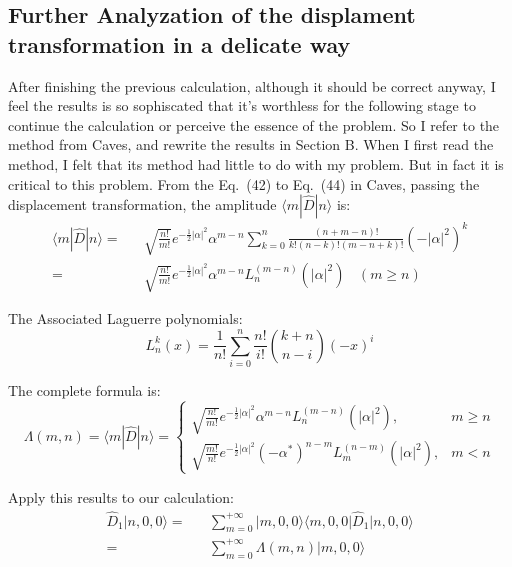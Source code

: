 \documentclass[%
 reprint,
 amsmath,amssymb,
 aps,
onecolumn
]{revtex4-2}
\begin{document}
\subsection{Further Analyzation of the displament transformation in a delicate way}
After finishing the previous calculation, although it should be correct anyway,
I feel the results is so sophiscated that it's worthless for the following stage 
to continue the calculation or perceive the essence of the problem. 
So I refer to the method from Caves, and rewrite the results in Section B.
When I first read the method, I felt that its method had little to do with my problem.
But in fact it is critical to this problem.
From the Eq.~(42) to Eq.~(44) in Caves, passing the  displacement transformation,
the amplitude $\langle m |\hat{D}|n\rangle $ is:
\begin{eqnarray}
  \langle m |\hat{D}|n\rangle = &&
  \sqrt{\frac{n!}{m!}} e^{-\frac{1}{2}|\alpha|^2} \alpha^{m-n} \sum_{k=0}^n \frac{(n+m-n)!}{k!(n-k)!(m-n+k)!} (-|\alpha|^2)^k
  \nonumber \\ = &&
  \sqrt{\frac{n!}{m!}} e^{-\frac{1}{2}|\alpha|^2} \alpha^{m-n}  L_n^{(m-n)} (|\alpha|^2) ~~~~(m \geqslant n)
\end{eqnarray}

The Associated Laguerre polynomials:
\begin{equation}
  L_n^k(x) = \frac{1}{n!} \sum_{i=0}^n \frac{n!}{i!} \binom{k+n}{n-i} (-x)^i 
\end{equation}

The complete formula is:
\begin{equation}
  \Lambda(m,n) = \langle m |\hat{D}|n\rangle =
\begin{cases} 
  \sqrt{\frac{n!}{m!}} e^{-\frac{1}{2}|\alpha|^2} \alpha^{m-n}  L_n^{(m-n)} (|\alpha|^2) ,  & m \geqslant n \\
  \sqrt{\frac{m!}{n!}} e^{-\frac{1}{2}|\alpha|^2} (-\alpha^*)^{n-m}  L_m^{(n-m)} (|\alpha|^2) ,  & m < n
\end{cases}
\label{Lambda(m,n)}
\end{equation}

Apply this results to our calculation:
\begin{eqnarray}
  \hat{D}_1 |n,0,0\rangle =&& \sum_{m=0}^{+\infty} |m,0,0\rangle \langle m,0,0 |\hat{D}_1| n,0,0\rangle
  \nonumber \\ = &&
  \sum_{m=0}^{+\infty} \Lambda(m,n) |m,0,0\rangle
  \label{Caves_idea}
\end{eqnarray}
\end{document}
